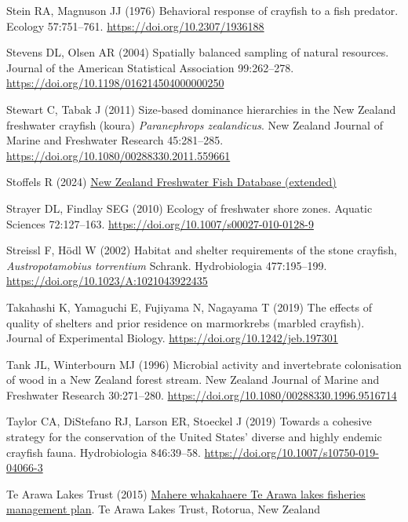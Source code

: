\documentclass[
  12pt,
  a4paper,
]{scrbook}
\newlength{\cslhangindent}
\newenvironment{CSLReferences}[2] %
 {\begin{list}{}{%
  \setlength{\itemindent}{0pt}
  \setlength{\leftmargin}{0pt}
  \setlength{\parsep}{0pt}
  \ifodd #1
   \setlength{\leftmargin}{\cslhangindent}
   \setlength{\itemindent}{-1\cslhangindent}
  \fi
  \setlength{\itemsep}{#2\baselineskip}}}
 {\end{list}}
\begin{document}
\begin{CSLReferences}{1}{1}
Stein RA, Magnuson JJ (1976) Behavioral response of crayfish to a fish
predator. Ecology 57:751--761. \url{https://doi.org/10.2307/1936188}

Stevens DL, Olsen AR (2004) Spatially balanced sampling of natural
resources. Journal of the American Statistical Association 99:262--278.
\url{https://doi.org/10.1198/016214504000000250}

Stewart C, Tabak J (2011) Size‐based dominance hierarchies in the {New
Zealand} freshwater crayfish (koura) {\emph{Paranephrops zealandicus}}.
New Zealand Journal of Marine and Freshwater Research 45:281--285.
\url{https://doi.org/10.1080/00288330.2011.559661}

Stoffels R (2024) \href{https://doi.org/10.15468/jbpw92}{{New Zealand
Freshwater Fish Database} (extended)}

Strayer DL, Findlay SEG (2010) Ecology of freshwater shore zones.
Aquatic Sciences 72:127--163.
\url{https://doi.org/10.1007/s00027-010-0128-9}

Streissl F, Hödl W (2002) Habitat and shelter requirements of the stone
crayfish, {\emph{Austropotamobius torrentium}} {Schrank}. Hydrobiologia
477:195--199. \url{https://doi.org/10.1023/A:1021043922435}

Takahashi K, Yamaguchi E, Fujiyama N, Nagayama T (2019) The effects of
quality of shelters and prior residence on marmorkrebs (marbled
crayfish). Journal of Experimental Biology.
\url{https://doi.org/10.1242/jeb.197301}

Tank JL, Winterbourn MJ (1996) Microbial activity and invertebrate
colonisation of wood in a {New Zealand} forest stream. New Zealand
Journal of Marine and Freshwater Research 30:271--280.
\url{https://doi.org/10.1080/00288330.1996.9516714}

Taylor CA, DiStefano RJ, Larson ER, Stoeckel J (2019) Towards a cohesive
strategy for the conservation of the {United States}' diverse and highly
endemic crayfish fauna. Hydrobiologia 846:39--58.
\url{https://doi.org/10.1007/s10750-019-04066-3}

Te Arawa Lakes Trust (2015)
\href{https://tearawa.io/wp-content/uploads/2021/07/Mahere-Whakahaere-Fisheries-Management-Plan-Te-Arawa-Lakes-Trust.pdf}{Mahere
whakahaere {Te Arawa} lakes fisheries management plan}. Te Arawa Lakes
Trust, Rotorua, New Zealand


\end{CSLReferences}
\end{document}

